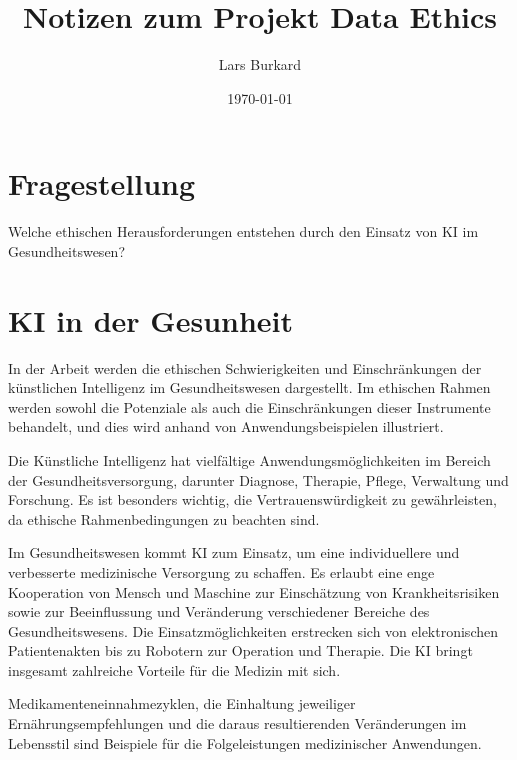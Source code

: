 \documentclass{article}
\title{Notizen zum Projekt Data Ethics}
\author{Lars Burkard}
\date{\today}
\begin{document}
\maketitle


\tableofcontents

\section{Fragestellung
    \label{sec:fragestellung}}


    Welche ethischen Herausforderungen entstehen durch den Einsatz von KI im Gesundheitswesen?

\section{KI in der Gesunheit}
In der Arbeit werden die ethischen Schwierigkeiten und Einschränkungen der künstlichen Intelligenz im Gesundheitswesen dargestellt. Im ethischen Rahmen werden sowohl die Potenziale als auch die Einschränkungen dieser Instrumente behandelt, und dies wird anhand von Anwendungsbeispielen illustriert.

\vspace{2mm}Die Künstliche Intelligenz hat vielfältige Anwendungsmöglichkeiten im Bereich der Gesundheitsversorgung, darunter Diagnose, Therapie, Pflege, Verwaltung und Forschung. Es ist besonders wichtig, die Vertrauenswürdigkeit zu gewährleisten, da ethische Rahmenbedingungen zu beachten sind.

\vspace{27mm}Im Gesundheitswesen kommt KI zum Einsatz, um eine individuellere und verbesserte medizinische Versorgung zu schaffen. Es erlaubt eine enge Kooperation von Mensch und Maschine zur Einschätzung von Krankheitsrisiken sowie zur Beeinflussung und Veränderung verschiedener Bereiche des Gesundheitswesens. Die Einsatzmöglichkeiten erstrecken sich von elektronischen Patientenakten bis zu Robotern zur Operation und Therapie. Die KI bringt insgesamt zahlreiche Vorteile für die Medizin mit sich.

\vspace{2mm}Medikamenteneinnahmezyklen, die Einhaltung jeweiliger Ernährungsempfehlungen und die daraus resultierenden Veränderungen im Lebensstil sind Beispiele für die Folgeleistungen medizinischer Anwendungen. 
\end{document}
